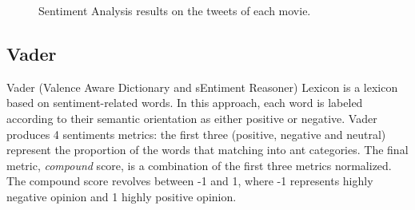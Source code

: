 \begin{figure}[t!]
    \begin{center}
    \qquad
    \qquad
    \caption{Sentiment Analysis results on the tweets of each movie.}%
    \label{fig:example}%
    \end{center}
\end{figure}

\subsection{Vader\label{vader}}
Vader (Valence Aware Dictionary and sEntiment Reasoner) Lexicon is a lexicon based on sentiment-related words. In this approach, each word is labeled according to their semantic orientation as either positive or negative. Vader produces 4 sentiments metrics: the first three (positive, negative and neutral) represent the proportion of the words that matching into ant categories. The final metric, \textit{compound} score, is a combination of the first three metrics normalized. The compound score revolves between -1 and 1, where -1 represents highly negative opinion and 1 highly positive opinion.


